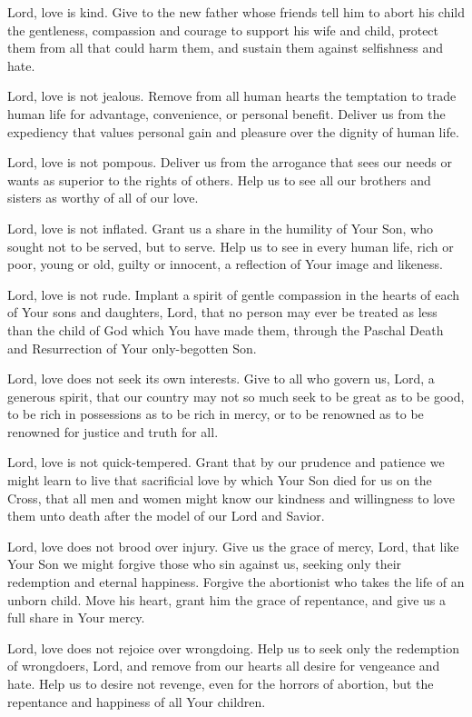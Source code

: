 \documentclass[12pt]{article}
\begin{document}
Lord, love is kind.
Give to the new father whose friends tell him to abort his child the gentleness, compassion and courage to support his wife and child, protect them from all that could harm them, and sustain them against selfishness and hate.

Lord, love is not jealous.
Remove from all human hearts the temptation to trade human life for advantage, convenience, or personal benefit.
Deliver us from the expediency that values personal gain and pleasure over the dignity of human life.

Lord, love is not pompous.
Deliver us from the arrogance that sees our needs or wants as superior to the rights of others.
Help us to see all our brothers and sisters as worthy of all of our love.

Lord, love is not inflated.
Grant us a share in the humility of Your Son, who sought not to be served, but to serve. Help us to see in every human life, rich or poor, young or old, guilty or innocent, a reflection of Your image and likeness. 

Lord, love is not rude.
Implant a spirit of gentle compassion in the hearts of each of Your sons and daughters, Lord, that no person may ever be treated as less than the child of God which You have made them, through the Paschal Death and Resurrection of Your only-begotten Son.

Lord, love does not seek its own interests.
Give to all who govern us, Lord, a generous spirit, that our country may not so much seek to be great as to be good, to be rich in possessions as to be rich in mercy, or to be renowned as to be renowned for justice and truth for all.

Lord, love is not quick-tempered.
Grant that by our prudence and patience we might learn to live that sacrificial love by which Your Son died for us on the Cross, that all men and women might know our kindness and willingness to love them unto death after the model of our Lord and Savior.

Lord, love does not brood over injury.
Give us the grace of mercy, Lord, that like Your Son we might forgive those who sin against us, seeking only their redemption and eternal happiness.
Forgive the abortionist who takes the life of an unborn child.
Move his heart, grant him the grace of repentance, and give us a full share in Your mercy.

Lord, love does not rejoice over wrongdoing.
Help us to seek only the redemption of wrongdoers, Lord, and remove from our hearts all desire for vengeance and hate.
Help us to desire not revenge, even for the horrors of abortion, but the repentance and happiness of all Your children.
\end{document}
